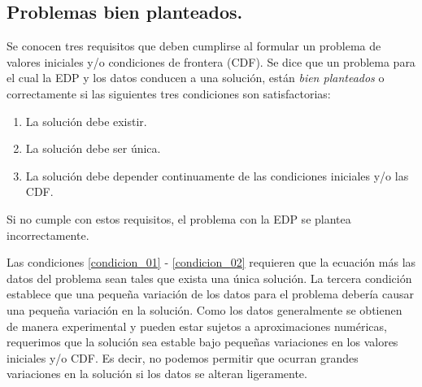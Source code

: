 \subsection{Problemas bien planteados.}
Se conocen tres requisitos que deben cumplirse al formular un problema de valores iniciales y/o condiciones de frontera (CDF). Se dice que un problema para el cual la EDP y los datos conducen a una solución, están \emph{bien planteados} o correctamente si las siguientes tres condiciones son satisfactorias:
\begin{enumerate}[label=\roman*)]
\item La solución debe existir. \label{condicion_01}
\item La solución debe ser única. \label{condicion_02}
\item La solución debe depender continuamente de las condiciones iniciales y/o las CDF. \label{condicion_03}
\end{enumerate}
Si no cumple con estos requisitos, el problema con la EDP se plantea incorrectamente.
\par
Las condiciones \ref{condicion_01} - \ref{condicion_02} requieren que la ecuación más las datos del problema sean tales que exista una única solución. La tercera condición establece que una pequeña variación de los datos para el problema debería causar una pequeña variación en la solución. Como los datos generalmente se obtienen de manera experimental y pueden estar sujetos a aproximaciones numéricas, requerimos que la solución sea estable bajo pequeñas variaciones en los valores iniciales y/o CDF. Es decir, no podemos permitir que ocurran grandes variaciones en la solución si los datos se alteran ligeramente.

